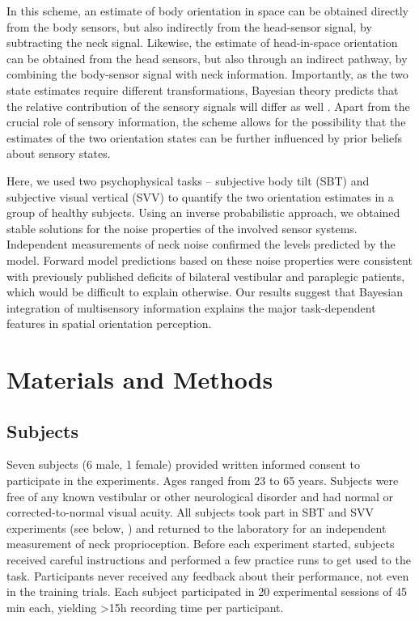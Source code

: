 In this scheme, an estimate of body orientation in space can be obtained directly from the body sensors, but also indirectly from the head-sensor signal, by subtracting the neck signal. Likewise, the estimate of head-in-space orientation can be obtained from the head sensors, but also through an indirect pathway, by combining the body-sensor signal with neck information. Importantly, as the two state estimates require different transformations, Bayesian theory predicts that the relative contribution of the sensory signals will differ as well \cite{mcguire2009}. Apart from the crucial role of sensory information, the scheme allows for the possibility that the estimates of the two orientation states can be further influenced by prior beliefs about sensory states. 

Here, we used two psychophysical tasks -- subjective body tilt (SBT) and subjective visual vertical (SVV) to quantify the two orientation estimates in a group of healthy subjects. Using an inverse probabilistic approach, we obtained stable solutions for the noise properties of the involved sensor systems. Independent measurements of neck noise confirmed the levels predicted by the model. Forward model predictions based on these noise properties were consistent with previously published deficits of bilateral vestibular and paraplegic patients, which would be difficult to explain otherwise. Our results suggest that Bayesian integration of multisensory information explains the major task-dependent features in spatial orientation perception. 



\section{Materials and Methods}
\label{p1:sec:methods}

\subsection{Subjects}

Seven subjects (6 male, 1 female) provided written informed consent to participate in the experiments. Ages ranged from 23 to 65 years. Subjects were free of any known vestibular or other neurological disorder and had normal or corrected-to-normal visual acuity. All subjects took part in SBT and SVV experiments (see below, ) and returned to the laboratory for an independent measurement of neck proprioception. Before each experiment started, subjects received careful instructions and performed a few practice runs to get used to the task. Participants never received any feedback about their performance, not even in the training trials. Each subject participated in 20 experimental sessions of {\textapprox}45 min each, yielding {\textgreater}15h recording time per participant.

